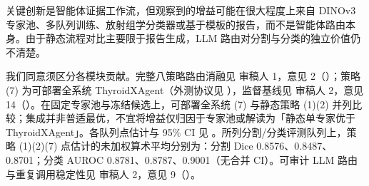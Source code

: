 \begin{reviewercomment}
关键创新是智能体证据工作流，但观察到的增益可能在很大程度上来自 DINOv3 专家池、多队列训练、放射组学分类器或基于模板的报告，而不是智能体路由本身。由于静态流程对比主要限于报告生成，LLM 路由对分割与分类的独立价值仍不清楚。
\end{reviewercomment}
\begin{authorresponse}
我们同意须区分各模块贡献。完整八策略路由消融见 审稿人 1，意见 2（）；策略 (7) 为可部署全系统 ThyroidXAgent（外测协议见 ），监督基线见 审稿人 2，意见 14（）。在固定专家池与冻结候选上，可部署全系统 (7) 与静态策略 (1)(2) 并列比较；集成并非普适最优，不宜将增益仅归因于专家池或解读为「静态单专家优于 ThyroidXAgent」。各队列点估计与 95\% CI 见 。所列分割/分类评测队列上，策略 (1)(2)(7) 点估计的未加权算术平均分别为：分割 Dice 0.8576、0.8487、0.8701；分类 AUROC 0.8781、0.8787、0.9001（无合并 CI）。可审计 LLM 路由与重复调用稳定性见 审稿人 2，意见 9（）。
\par
\end{authorresponse}

